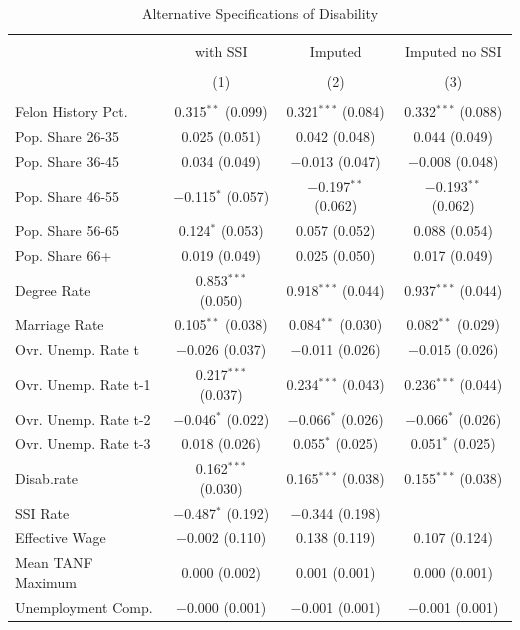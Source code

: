 \documentclass[11pt,]{article}
\begin{document}
\begin{table}[!htbp] \centering 
  \caption{Alternative Specifications of Disability} 
  \label{} 
\small 
\begin{tabular}{@{\extracolsep{5pt}}lccc} 
\\[-1.8ex]\hline 
\hline \\[-1.8ex] 
 & with SSI & Imputed & Imputed no SSI \\ 
\\[-1.8ex] & (1) & (2) & (3)\\ 
\hline \\[-1.8ex] 
 Felon History Pct. & 0.315$^{**}$ (0.099) & 0.321$^{***}$ (0.084) & 0.332$^{***}$ (0.088) \\ 
  Pop. Share 26-35 & 0.025 (0.051) & 0.042 (0.048) & 0.044 (0.049) \\ 
  Pop. Share 36-45 & 0.034 (0.049) & $-$0.013 (0.047) & $-$0.008 (0.048) \\ 
  Pop. Share 46-55 & $-$0.115$^{*}$ (0.057) & $-$0.197$^{**}$ (0.062) & $-$0.193$^{**}$ (0.062) \\ 
  Pop. Share 56-65 & 0.124$^{*}$ (0.053) & 0.057 (0.052) & 0.088 (0.054) \\ 
  Pop. Share 66+ & 0.019 (0.049) & 0.025 (0.050) & 0.017 (0.049) \\ 
  Degree Rate & 0.853$^{***}$ (0.050) & 0.918$^{***}$ (0.044) & 0.937$^{***}$ (0.044) \\ 
  Marriage Rate & 0.105$^{**}$ (0.038) & 0.084$^{**}$ (0.030) & 0.082$^{**}$ (0.029) \\ 
  Ovr. Unemp. Rate t & $-$0.026 (0.037) & $-$0.011 (0.026) & $-$0.015 (0.026) \\ 
  Ovr. Unemp. Rate t-1 & 0.217$^{***}$ (0.037) & 0.234$^{***}$ (0.043) & 0.236$^{***}$ (0.044) \\ 
  Ovr. Unemp. Rate t-2 & $-$0.046$^{*}$ (0.022) & $-$0.066$^{*}$ (0.026) & $-$0.066$^{*}$ (0.026) \\ 
  Ovr. Unemp. Rate t-3 & 0.018 (0.026) & 0.055$^{*}$ (0.025) & 0.051$^{*}$ (0.025) \\ 
  Disab.rate & 0.162$^{***}$ (0.030) & 0.165$^{***}$ (0.038) & 0.155$^{***}$ (0.038) \\ 
  SSI Rate & $-$0.487$^{*}$ (0.192) & $-$0.344 (0.198) &  \\ 
  Effective Wage & $-$0.002 (0.110) & 0.138 (0.119) & 0.107 (0.124) \\ 
  Mean TANF Maximum & 0.000 (0.002) & 0.001 (0.001) & 0.000 (0.001) \\ 
  Unemployment Comp. & $-$0.000 (0.001) & $-$0.001 (0.001) & $-$0.001 (0.001) \\ 

\end{tabular}
\end{table}
\end{document}
